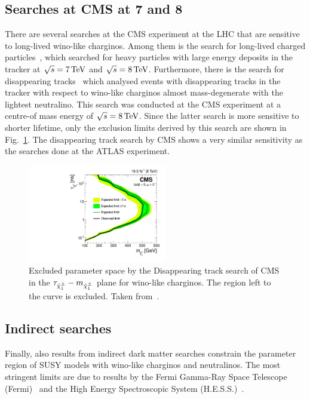 \subsection*{Searches at CMS at 7 and 8\tev}
There are several searches at the CMS experiment at the LHC that are sensitive to long-lived wino-like charginos.
Among them is the search for long-lived charged particles~\cite{bib:CMS:HSCP_8TeV}, which searched for heavy particles with large energy deposits in the tracker at $\sqrt{s}=7\,\text{Te}\kern-0.06667em\text{V}$  and $\sqrt{s}=8\,\text{Te}\kern-0.06667em\text{V}$.
Furthermore, there is the search for disappearing tracks~\cite{bib:CMS:DT_8TeV} which analysed events with disappearing tracks in the tracker with respect to wino-like charginos almost mass-degenerate with the lightest neutralino.
This search was conducted at the CMS experiment at a centre-of mass energy of $\sqrt{s}=8\,\text{Te}\kern-0.06667em\text{V}$.
Since the latter search is more sensitive to shorter lifetime, only the exclusion limits derived by this search are shown in Fig.~\ref{fig:CMS}.
The disappearing track search by CMS shows a very similar sensitivity as the searches done at the ATLAS experiment.
\begin{figure}[!h]
  \centering
      \includegraphics[width=0.54\textwidth]{figures/theory/lifetimeNs_vs_mass.pdf}
  \caption{Excluded parameter space by the Disappearing track search of CMS in the $\tau_{\tilde{\chi}^{\pm}_{1}}-m_{\tilde{\chi}^{\pm}_{1}}$ plane for wino-like charginos. The region left to the curve is excluded. Taken from~\cite{bib:CMS:DT_8TeV}.}  
  \label{fig:CMS}
\end{figure}

\subsection*{Indirect searches}
Finally, also results from indirect dark matter searches constrain the parameter region of SUSY models with wino-like charginos and neutralinos.
The most stringent limits are due to results by the Fermi Gamma-Ray Space Telescope (Fermi)~\cite{bib:Fermi} and the High Energy Spectroscopic System (H.E.S.S.)~\cite{bib:HESS}.

